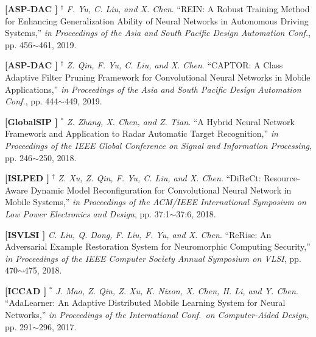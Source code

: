 	\textbf{[ASP-DAC ]}
	$^\dagger$
	\textsl{F. Yu, C. Liu, and X. Chen}.
		``REIN\@: A Robust Training Method for Enhancing Generalization Ability of Neural Networks in Autonomous Driving Systems,''
		\textsl{in Proceedings of the Asia and South Pacific Design Automation Conf.}, pp. 456$\sim$461, 2019.
			\vspace{-3mm}

	\textbf{[ASP-DAC ]}
	$^\dagger$
	\textsl{Z. Qin, F. Yu, C. Liu, and X. Chen}.
		``CAPTOR\@: A Class Adaptive Filter Pruning Framework for Convolutional Neural Networks in Mobile Applications,''
		\textsl{in Proceedings of the Asia and South Pacific Design Automation Conf.}, pp. 444$\sim$449, 2019.
			\vspace{-3mm}

	\textbf{[GlobalSIP ]}
	$^\ast$
	\textsl{Z. Zhang, X. Chen, and Z. Tian}.
		``A Hybrid Neural Network Framework and Application to Radar Automatic Target Recognition,''
		\textsl{in Proceedings of the IEEE Global Conference on Signal and Information Processing}, pp. 246$\sim$250, 2018.
			\vspace{-3mm}

	\textbf{[ISLPED ]}
	$^\dagger$
	\textsl{Z. Xu, Z. Qin, F. Yu, C. Liu, and X. Chen}.
		``DiReCt\@: Resource-Aware Dynamic Model Reconfiguration for Convolutional Neural Network in Mobile Systems,''
		\textsl{in Proceedings of the ACM/IEEE International Symposium on Low Power Electronics and Design}, pp. 37:1$\sim$37:6, 2018.
			\vspace{-3mm}

	\textbf{[ISVLSI ]}\hspace{2mm}
	\textsl{C. Liu, Q. Dong, F. Liu, F. Yu, and X. Chen}.
		``ReRise\@: An Adversarial Example Restoration System for Neuromorphic Computing Security,''
		\textsl{in Proceedings of the IEEE Computer Society Annual Symposium on VLSI}, pp. 470$\sim$475, 2018.
			\vspace{-3mm}

	\textbf{[ICCAD ]}
	$^\ast$
	\textsl{J. Mao, Z. Qin, Z. Xu, K. Nixon, X. Chen, H. Li, and Y. Chen}.
		``AdaLearner\@: An Adaptive Distributed Mobile Learning System for Neural Networks,''
		\textsl{in Proceedings of the International Conf.\ on Computer-Aided Design}, pp. 291$\sim$296, 2017.
			\vspace{-3mm}

